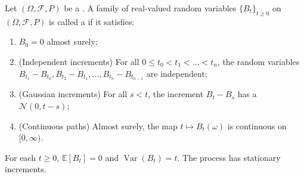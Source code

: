 \begin{definition} \label{definition:standard_brownian_motion_on_a_probability_space}
Let $(\Omega, \mathcal{F}, P)$ be a . A family of real-valued random variables $\{B_t\}_{t \geq 0}$ on $(\Omega, \mathcal{F}, P)$ is called a  if it satisfies:

\begin{enumerate}
    \item $B_0 = 0$ almost surely;
    \item (Independent increments) For all $0 \leq t_0 < t_1 < \dots < t_n$, the random variables $B_{t_1} - B_{t_0}, B_{t_2} - B_{t_1}, \dots, B_{t_n} - B_{t_{n-1}}$ are independent;
    \item (Gaussian increments) For all $s < t$, the increment $B_t - B_s$ has a  $\mathcal{N}(0, t - s)$;
    \item (Continuous paths) Almost surely, the map $t \mapsto B_t(\omega)$ is continuous on $[0, \infty)$.
\end{enumerate}

For each $t \geq 0$, $\mathbb{E}[B_t] = 0$ and $\operatorname{Var}(B_t) = t$. The process has stationary increments.
\end{definition}
